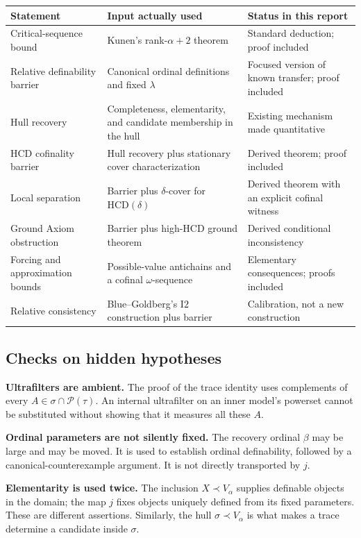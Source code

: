 \documentclass[11pt,letterpaper]{article}
\theoremstyle{definition}
\newcommand{\Itwo}{\mathrm{I2}}
\newcommand{\HCD}{\mathrm{HCD}}
\newcommand{\Pow}{\mathcal P}
\numberwithin{equation}{section}
\begin{document}
\begin{center}
\renewcommand{\arraystretch}{1.16}
\begin{tabularx}{\textwidth}{@{}P{.23\textwidth}YY@{}}
\toprule
Statement & Input actually used & Status in this report\\
\midrule
Critical-sequence bound & Kunen's rank-$\alpha+2$ theorem & Standard deduction; proof included\\
Relative definability barrier & Canonical ordinal definitions and fixed $\lambda$ & Focused version of known transfer; proof included\\
Hull recovery & Completeness, elementarity, and candidate membership in the hull & Existing mechanism made quantitative\\
HCD cofinality barrier & Hull recovery plus stationary cover characterization & Derived theorem; proof included\\
Local separation & Barrier plus $\delta$-cover for $\HCD(\delta)$ & Derived theorem with an explicit cofinal witness\\
Ground Axiom obstruction & Barrier plus high-HCD ground theorem & Derived conditional inconsistency\\
Forcing and approximation bounds & Possible-value antichains and a cofinal $\omega$-sequence & Elementary consequences; proofs included\\
Relative consistency & Blue--Goldberg's $\Itwo$ construction plus barrier & Calibration, not a new construction\\
\bottomrule
\end{tabularx}
\end{center}

\subsection{Checks on hidden hypotheses}

\textbf{Ultrafilters are ambient.} The proof of the trace identity uses complements of every $A\in\sigma\cap\Pow(\tau)$. An internal ultrafilter on an inner model's powerset cannot be substituted without showing that it measures all these $A$.

\textbf{Ordinal parameters are not silently fixed.} The recovery ordinal $\beta$ may be large and may be moved. It is used to establish ordinal definability, followed by a canonical-counterexample argument. It is not directly transported by $j$.

\textbf{Elementarity is used twice.} The inclusion $X\prec V_\alpha$ supplies definable objects in the domain; the map $j$ fixes objects uniquely defined from its fixed parameters. These are different assertions. Similarly, the hull $\sigma\prec V_\alpha$ is what makes a trace determine a candidate inside $\sigma$.
\end{document}
